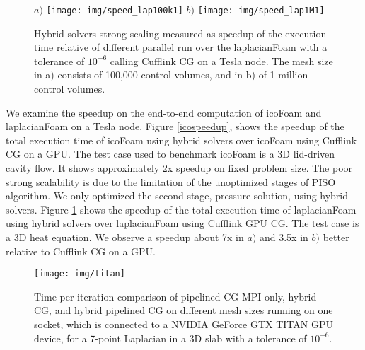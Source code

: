 \documentclass[3p,times]{elsarticle}
\begin{document}
\begin{figure}[h!]
\begin{center}
\emph{$a)$} \texttt{[image: img/speed\_lap100k1]}
\emph{$b)$} \texttt{[image: img/speed\_lap1M1]}
\caption{Hybrid solvers strong scaling measured as speedup of the execution time relative of different parallel run over the laplacianFoam with a tolerance of $10^{-6}$ calling Cufflink CG on a Tesla node. The mesh size in a) consists of 100,000 control volumes, and in b) of 1 million control volumes.}
\label{lapspeedup}
\end{center}
\end{figure}  

We examine the speedup on the end-to-end computation of icoFoam and laplacianFoam on a Tesla node. Figure \ref{icospeedup}, shows the speedup of the total execution time of icoFoam using hybrid solvers over icoFoam using Cufflink CG on a GPU. The test case used to benchmark icoFoam is a 3D lid-driven cavity flow. It shows approximately 2x speedup on fixed problem size. The poor strong scalability is due to the limitation of the unoptimized stages of PISO algorithm. We only optimized the second stage, pressure solution, using hybrid solvers. Figure \ref{lapspeedup} shows the speedup of the total execution time of laplacianFoam using hybrid solvers over laplacianFoam using Cufflink GPU CG. The test case is a 3D heat equation. We observe a speedup about 7x in \emph{$a)$} and 3.5x in \emph{$b)$} better relative to Cufflink CG on a GPU. \\



\begin{figure}[h]
\begin{center}
\texttt{[image: img/titan]}
\caption{Time per iteration comparison of pipelined CG MPI only, hybrid CG, and hybrid pipelined CG on different mesh sizes running on one socket, which is connected to a NVIDIA GeForce GTX TITAN GPU device, for a 7-point Laplacian in a 3D slab with a tolerance of $10^{-6}$.}
\label{titan_com}
\end{center}
\end{figure} 
\end{document}
